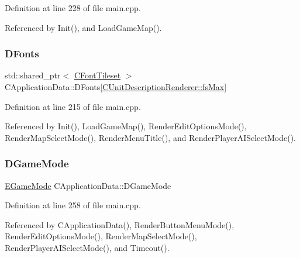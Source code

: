 Definition at line 228 of file main.\+cpp.



Referenced by Init(), and Load\+Game\+Map().

\hypertarget{classCApplicationData_afde9247d0a3ea87393ec86dcdb1e8274}{}\label{classCApplicationData_afde9247d0a3ea87393ec86dcdb1e8274} 
\subsubsection{\texorpdfstring{D\+Fonts}{DFonts}}
{\footnotesize\ttfamily std\+::shared\+\_\+ptr$<$ \hyperlink{classCFontTileset}{C\+Font\+Tileset} $>$ C\+Application\+Data\+::\+D\+Fonts\mbox{[}\hyperlink{classCUnitDescriptionRenderer_a3ea4cd83b6dd9533ab3abb953a7da35aa74218e4708bac1eab359099eb0b159b2}{C\+Unit\+Description\+Renderer\+::fs\+Max}\mbox{]}\hspace{0.3cm}{\ttfamily [protected]}}



Definition at line 215 of file main.\+cpp.



Referenced by Init(), Load\+Game\+Map(), Render\+Edit\+Options\+Mode(), Render\+Map\+Select\+Mode(), Render\+Menu\+Title(), and Render\+Player\+A\+I\+Select\+Mode().

\hypertarget{classCApplicationData_a2f906f2b4208ecb2a057e6b62e549685}{}\label{classCApplicationData_a2f906f2b4208ecb2a057e6b62e549685} 
\subsubsection{\texorpdfstring{D\+Game\+Mode}{DGameMode}}
{\footnotesize\ttfamily \hyperlink{classCApplicationData_ac8ac37a4c8bb871036fbbdc6a072e403}{E\+Game\+Mode} C\+Application\+Data\+::\+D\+Game\+Mode\hspace{0.3cm}{\ttfamily [protected]}}



Definition at line 258 of file main.\+cpp.



Referenced by C\+Application\+Data(), Render\+Button\+Menu\+Mode(), Render\+Edit\+Options\+Mode(), Render\+Map\+Select\+Mode(), Render\+Player\+A\+I\+Select\+Mode(), and Timeout().

